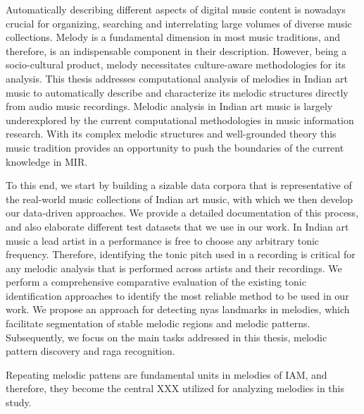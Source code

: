 
Automatically describing different aspects of digital music content is nowadays crucial for organizing, searching and interrelating large volumes of diverse music collections. Melody is a fundamental dimension in most music traditions, and therefore, is an indispensable component in their description. However, being a socio-cultural product, melody necessitates culture-aware methodologies for its analysis. This thesis addresses computational analysis of melodies in Indian art music to automatically describe and characterize its melodic structures directly from audio music recordings. Melodic analysis in Indian art music is largely underexplored by the current computational methodologies in music information research. With its complex melodic structures and well-grounded theory this music tradition provides an opportunity to push the boundaries of the current knowledge in MIR. 

To this end, we start by building a sizable data corpora that is representative of the real-world music collections of Indian art music, with which we then develop our data-driven approaches. We provide a detailed documentation of this process, and also elaborate different test datasets that we use in our work. In Indian art music a lead artist in a performance is free to choose any arbitrary tonic frequency. Therefore, identifying the tonic pitch used in a recording is critical for any melodic analysis that is performed across artists and their recordings. We perform a comprehensive comparative evaluation of the existing tonic identification approaches to identify the most reliable method to be used in our work. We propose an approach for detecting nyas landmarks in melodies, which facilitate segmentation of stable melodic regions and melodic patterns. Subsequently, we focus on the main tasks addressed in this thesis, melodic pattern discovery and raga recognition. 

Repeating melodic pattens are fundamental units in melodies of IAM, and therefore, they become the central XXX utilized for analyzing melodies in this study. 

